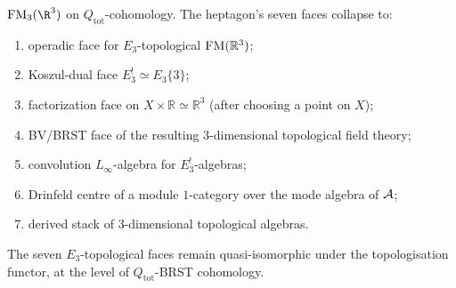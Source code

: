 \begin{theorem}
$\FM_3(\R^3)$ on $Q_{\mathrm{tot}}$-cohomology. The
heptagon's seven faces collapse to:
\begin{enumerate}
 \item operadic face for $E_3$-topological $\mathrm{FM}(\mathbb{R}^3)$;
 \item Koszul-dual face $E_3^{!}\simeq E_3\{3\}$;
 \item factorization face on $X\times\mathbb{R}\simeq\mathbb{R}^3$
 (after choosing a point on $X$);
 \item BV/BRST face of the resulting $3$-dimensional topological
 field theory;
 \item convolution $L_\infty$-algebra for $E_3^{!}$-algebras;
 \item Drinfeld centre of a module $1$-category over the
 mode algebra of $\mathcal{A}$;
 \item derived stack of $3$-dimensional topological algebras.
\end{enumerate}
The seven $E_3$-topological faces remain quasi-isomorphic under the
topologisation functor, at the level of $Q_{\mathrm{tot}}$-BRST
cohomology.
\end{theorem}


